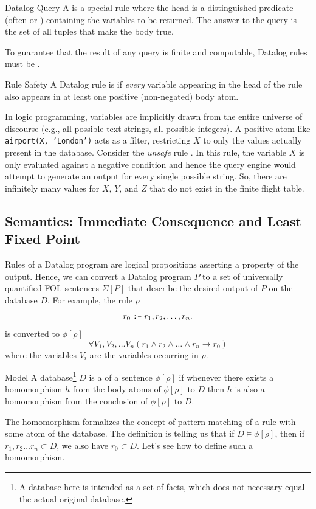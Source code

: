 \begin{definition}{Datalog Query}
    A  is a special rule where the head is a distinguished predicate (often  or ) containing the variables to be returned. 
    The answer to the query is the set of all tuples that make the body true.
\end{definition}

To guarantee that the result of any query is finite and computable, Datalog rules must be .

\begin{definition}{Rule Safety}
    A Datalog rule is  if \emph{every} variable appearing in the head of the rule also appears in at least one positive (non-negated) body atom. 
\end{definition}
In logic programming, variables are implicitly drawn from the entire universe of discourse (e.g., all possible text strings, all possible integers). 
A positive atom like \texttt{airport(X, 'London')} acts as a filter, restricting \(X\) to only the values actually present in the database.
Consider the \emph{unsafe} rule . 
In this rule, the variable \(X\) is only evaluated against a negative condition and hence the query engine would attempt to generate an output for every single possible string.
So, there are infinitely many values for \(X\), \(Y\), and \(Z\) that do not exist in the finite flight table.

\subsection{Semantics: Immediate Consequence and Least Fixed Point}

Rules of a Datalog program are logical propositions asserting a property of the output.
Hence, we can convert a Datalog program \(P\) to a set of universally quantified FOL sentences \(\Sigma[P]\) that describe the desired output of \(P\) on the database \(D\).
For example, the rule \(\rho\)
\[
    r_0 \;\text{\texttt{:-}}\; r_1, r_2, \dots, r_n .
\]
is converted to \(\phi[\rho]\)
\[
    \forall V_1, V_2, \ldots V_n (r_1 \land r_2 \land \ldots \land r_n \to r_0)
\]
where the variables \(V_i\) are the variables occurring in \(\rho\). 

\begin{definition}{Model}
    A database\footnote{A database here is intended as a set of facts, which does not necessary equal the actual original database.} \(D\) is a  of a sentence \(\phi[\rho]\) if whenever there exists a homomorphism \(h\) from the body atoms of \(\phi[\rho]\) to \(D\) then \(h\) is also a homomorphism from the conclusion of \(\phi[\rho]\) to \(D\).
\end{definition}
The homomorphism formalizes the concept of pattern matching of a rule with some atom of the database. The definition is telling us that if \(D\models\phi[\rho]\), then if \(r_1,r_2 \ldots r_n \subset D\), we also have \(r_0 \subset D\).
Let's see how to define such a homomorphism.

